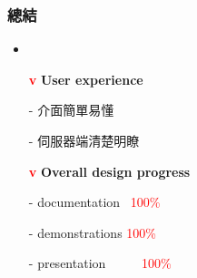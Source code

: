\documentclass[10pt, conference, compsocconf]{beamer}
\begin{document}
\begin{CJK}{UTF8}{}
\begin{frame}
\frametitle{總結}
\begin{itemize}
\item{}
\end{itemize}
\begin{itemize}
\item[\Large\bf \textcolor{red}v] \Large\bf User experience
\end{itemize}
\begin{itemize}
\item[-]  介面簡單易懂
\item[-]  伺服器端清楚明瞭
\end{itemize}

\begin{itemize}
\item[\Large\bf \textcolor{red}v] \Large\bf Overall design progress
\end{itemize}
\begin{itemize}
\item[-]  documentation \textcolor{red}{~100\%}
\item[-]  demonstrations \textcolor{red}{100\%}
\item[-]  presentation     \textcolor{red}{~~~~~100\%}
\end{itemize}
\end{frame}

\end{CJK}
\end{document}
